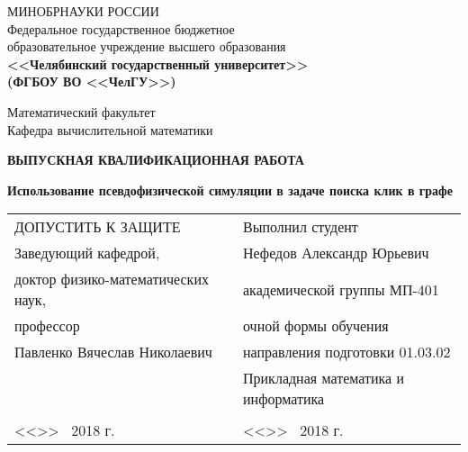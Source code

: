 \documentclass[14pt,a4paper,oneside,final]{extarticle}
\theoremstyle{fqwtheorem}
\begin{document}
\renewcommand\refname{\normalsize \hspace{-\parindent}Список литературы}
\renewcommand\contentsname{\normalsize \hspace{-\parindent}Содержание}
\thispagestyle{empty}

\begin{titlepage}
\newcommand{\CurrentYear}{ 2018 }
{\small{}
\begin{center}
  МИНОБРНАУКИ РОССИИ \\
  Федеральное государственное бюджетное \\
  образовательное учреждение высшего образования \\
  \textbf{<<Челябинский государственный университет>> \\ (ФГБОУ ВО <<ЧелГУ>>)}

  \vspace{10mm}

  Математический факультет \\
  Кафедра вычислительной математики %
\end{center}

\vspace{15mm}

\begin{center}
  \textbf{\MakeUppercase{Выпускная квалификационная работа}}
\end{center}

\vspace{10mm}

\begin{center}
  {\large\textbf{Использование псевдофизической симуляции в задаче поиска клик в графе}} %
\end{center}

\vfill

\noindent
\begin{tabular*}{\textwidth}{@{\extracolsep{\fill}}lcl}
\MakeUppercase{Допустить к защите}  & \hfill & Выполнил студент \\
Заведующий кафедрой, & & Нефедов Александр Юрьевич \\ %
доктор физико-математических наук, & & академической группы МП-401 \\ %
профессор & & очной формы обучения \\
Павленко Вячеслав Николаевич & & направления подготовки 01.03.02 \\
& & Прикладная математика и информатика \\
& & \\
<<\underline{\hspace{0.8cm}}>>\ \underline{\hspace{2.5cm}} \CurrentYear г. & & <<\underline{\hspace{0.8cm}}>>\ \underline{\hspace{2.5cm}} \CurrentYear г.
\end{tabular*}

}
\end{titlepage}
\end{document}
